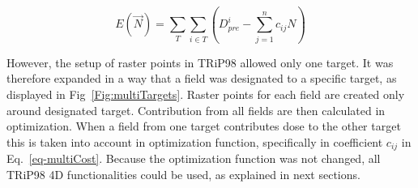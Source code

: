 \begin{equation}
\label{eq-multiCost}
 E(\vec{N}) = \sum_{T} \sum_{i\in T} \left( D_{pre}^{i} -\sum_{j=1}^n c_{ij}N\right)
\end{equation}

However, the setup of raster points in TRiP98 allowed only one target. It was therefore expanded in a way that a field was designated to a specific target, as displayed in Fig~\ref{Fig:multiTargets}. 
Raster points for each field are created only around designated target. Contribution from all fields are then calculated in optimization. When a field from one target contributes 
dose to the other target this is taken into account in optimization function, specifically in coefficient $c_{ij}$ in Eq.~\ref{eq-multiCost}. Because the optimization function was not changed, 
all TRiP98 4D functionalities could be used, as explained in next sections.


